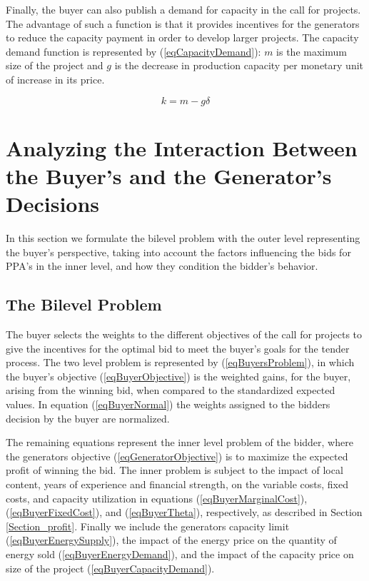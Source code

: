 \documentclass[informs]{informs3}
\begin{document}
Finally, the buyer can also publish a demand for capacity in the call for projects. The advantage of such a function is that it provides incentives for the generators to reduce the capacity payment in order to develop larger projects. The capacity demand function is represented by (\ref{eqCapacityDemand}): $m$ is the maximum size of the project and $g$ is the decrease in production capacity per monetary unit of increase in its price.


\begin{equation} \label{eqCapacityDemand}
k = m -g \delta
\end{equation}

\section{Analyzing the Interaction Between the Buyer's and the Generator's Decisions }\label{Section_interaction}

In this section we formulate the bilevel problem with the outer level representing the  buyer's perspective, taking into account the factors influencing the bids for PPA's in the inner level, and how they condition the bidder’s behavior. 


\subsection{The Bilevel Problem}\label{Section_problem}

The buyer selects the weights to the different objectives of the call for projects to give the incentives for the optimal bid to meet the buyer’s goals for the tender process. The two level problem is represented by (\ref{eqBuyersProblem}), in which the buyer’s objective (\ref{eqBuyerObjective}) is the weighted gains, for the buyer, arising from the winning bid, when compared to the standardized expected values. In equation (\ref{eqBuyerNormal}) the weights assigned to the bidders decision by the buyer are normalized.

The remaining equations represent the inner level problem of the bidder, where the generators objective (\ref{eqGeneratorObjective})  is to maximize the expected profit of winning the bid. The inner problem is subject to the impact of local content, years of experience and financial strength, on the variable costs, fixed costs, and capacity utilization in equations (\ref{eqBuyerMarginalCost}), (\ref{eqBuyerFixedCost}), and (\ref{eqBuyerTheta}), respectively, as described in Section \ref{Section_profit}. Finally we include the generators capacity limit (\ref{eqBuyerEnergySupply}), the impact of the energy price on the quantity of energy sold (\ref{eqBuyerEnergyDemand}), and the impact of the capacity price on size of the project  (\ref{eqBuyerCapacityDemand}).
\end{document}
